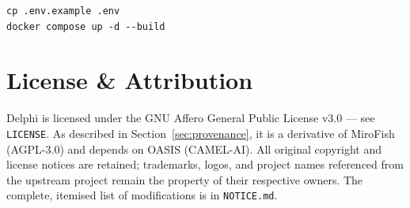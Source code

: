 \documentclass[11pt,a4paper]{article}
\begin{document}
\begin{lstlisting}
cp .env.example .env
docker compose up -d --build
\end{lstlisting}

\section{License \& Attribution}

Delphi is licensed under the GNU Affero General Public License v3.0 --- see
\texttt{LICENSE}. As described in Section~\ref{sec:provenance}, it is a
derivative of MiroFish (AGPL-3.0) and depends on OASIS (CAMEL-AI). All original
copyright and license notices are retained; trademarks, logos, and project names
referenced from the upstream project remain the property of their respective
owners. The complete, itemised list of modifications is in \texttt{NOTICE.md}.
\end{document}
